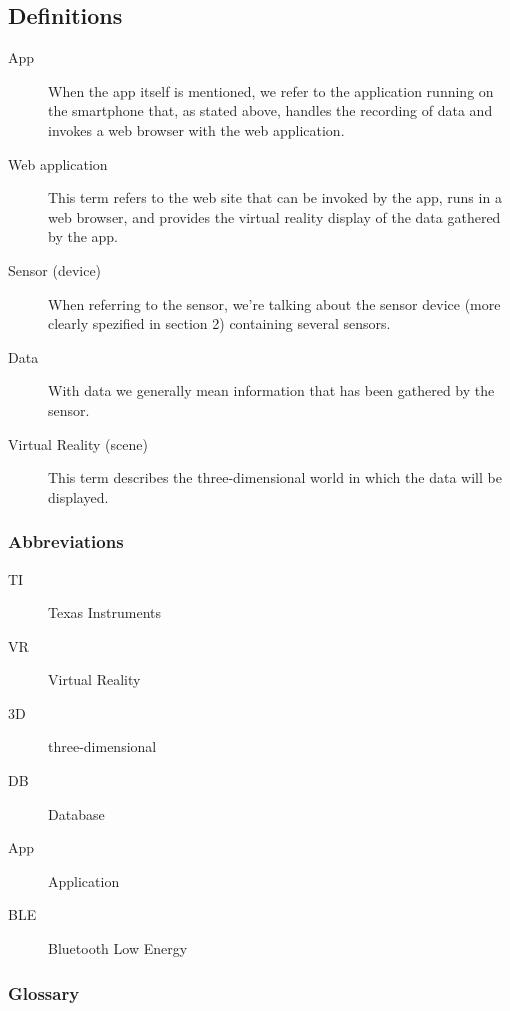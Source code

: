 \subsection{Definitions}

\begin{description}
	\item[App] When the app itself is mentioned, we refer to the application running on the smartphone that, as stated above, handles the recording of data and invokes a web browser with the web application.
	\item[Web application] This term refers to the web site that can be invoked by the app, runs in a web browser, and provides the virtual reality display of the data gathered by the app.
	\item[Sensor (device)] When referring to the sensor, we're talking about the sensor device (more clearly spezified in section 2) containing several sensors. 
	\item[Data] With data we generally mean information that has been gathered by the sensor.
	\item[Virtual Reality (scene)] This term describes the three-dimensional world in which the data will be displayed. 
	
\end{description}


\subsubsection{Abbreviations}

\begin{description}
	\item[TI] Texas Instruments
	\item[VR] Virtual Reality
	\item[3D] three-dimensional
	\item[DB] Database
	\item[App] Application
	\item[BLE] Bluetooth Low Energy
\end{description}

\subsubsection{Glossary}


